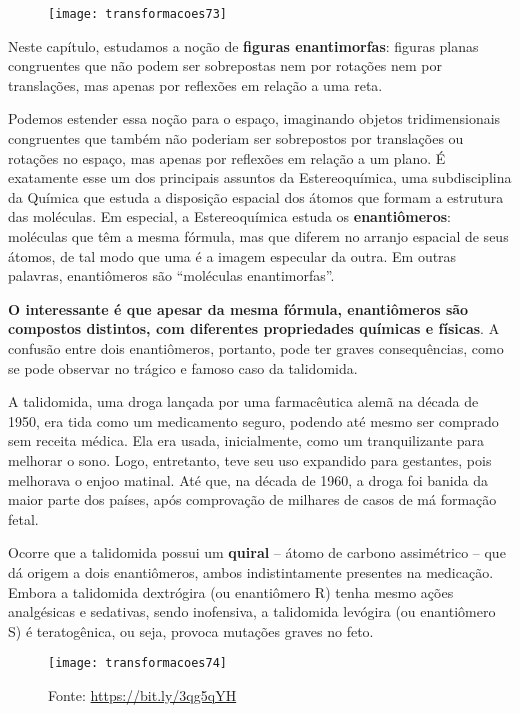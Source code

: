 \begin{figure}[H]
\centering

\texttt{[image: transformacoes73]}

\end{figure}


Neste capítulo, estudamos a noção de \textbf{figuras enantimorfas}: figuras planas congruentes que não podem ser sobrepostas nem por rotações nem por translações, mas apenas por reflexões em relação a uma reta. 

Podemos estender essa noção para o espaço, imaginando objetos tridimensionais congruentes que também não poderiam ser sobrepostos por translações ou rotações no espaço, mas apenas por reflexões em relação a um plano. É exatamente esse um dos principais assuntos da Estereoquímica, uma subdisciplina da Química que estuda a disposição espacial dos átomos que formam a estrutura das moléculas. Em especial, a Estereoquímica estuda os \textbf{enantiômeros}: moléculas que têm a mesma fórmula, mas que diferem no arranjo espacial de seus átomos, de tal modo que uma é a imagem especular da outra. Em outras palavras, enantiômeros são “moléculas enantimorfas”. 

\textbf{O interessante é que apesar da mesma fórmula, enantiômeros são compostos distintos, com diferentes propriedades químicas e físicas}. A confusão entre dois enantiômeros, portanto, pode ter graves consequências, como se pode observar no trágico e famoso caso da talidomida.

A talidomida, uma droga lançada por uma farmacêutica alemã na década de 1950, era tida como um medicamento seguro, podendo até mesmo ser comprado sem receita médica. Ela era usada, inicialmente, como um tranquilizante para melhorar o sono. Logo, entretanto, teve seu uso expandido para gestantes, pois melhorava o enjoo matinal. Até que, na década de 1960, a droga foi banida da maior parte dos países, após comprovação de milhares de casos de má formação fetal. 

Ocorre que a talidomida possui um \textbf{quiral} – átomo de carbono assimétrico – que dá origem a dois enantiômeros, ambos indistintamente presentes na medicação. Embora a talidomida dextrógira (ou enantiômero R) tenha mesmo ações analgésicas e sedativas, sendo inofensiva, a talidomida levógira (ou enantiômero S) é teratogênica, ou seja, provoca mutações graves no feto.
 

\begin{figure}[H]
\centering

\texttt{[image: transformacoes74]}
\caption{Fonte: \url{https://bit.ly/3qg5qYH}}

\end{figure}


